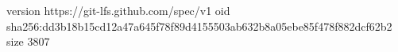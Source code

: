 version https://git-lfs.github.com/spec/v1
oid sha256:dd3b18b15cd12a47a645f78f89d4155503ab632b8a05ebe85f478f882dcf62b2
size 3807
